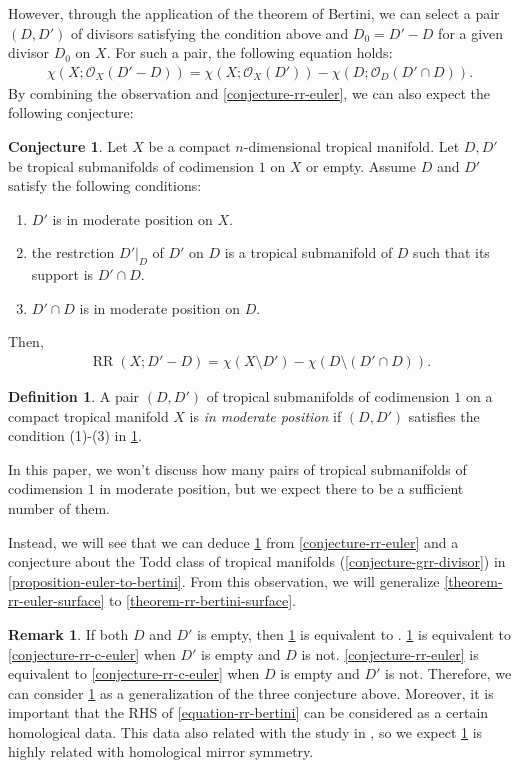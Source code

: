\documentclass[a4paper,dvipdfmx,reqno,12pt]{amsart}
\theoremstyle{definition}
\newtheorem{definition}[theorem]{Definition}
\newtheorem{conjecture}[theorem]{Conjecture}
\newtheorem{remark}[theorem]{Remark}
\newcommand{\opn}[1]{\operatorname{#1}}
\numberwithin{equation}{section}
\begin{document}
However, through the application of the theorem of
Bertini, we can select a pair $(D,D')$ of divisors 
satisfying the condition above 
and $D_0=D'-D$ for a given divisor $D_0$ on $X$.
For such a pair, the following equation holds:
\begin{align}
\chi(X;\mathcal{O}_X(D'-D))=
\chi(X;\mathcal{O}_X(D'))-
\chi(D;\mathcal{O}_D(D'\cap D)).
\end{align}
By combining the observation and \cref{conjecture-rr-euler}, 
we can also expect the following conjecture:
\begin{conjecture}
\label{conjecture-rr-bertini}
Let $X$ be a compact $n$-dimensional
tropical manifold. 
Let $D,D'$ be tropical submanifolds of codimension $1$
on $X$ or empty.
Assume $D$ and $D'$ satisfy the following conditions:
\begin{enumerate}
\item $D'$ is in moderate position on $X$.
\item the restrction $D'|_{D}$ of $D'$ on $D$ is 
a tropical submanifold of $D$ such that its support is   
$D'\cap D$.
\item $D'\cap D$ is in moderate position on $D$.
\end{enumerate}
Then,
\begin{align}
\label{equation-rr-bertini}
\opn{RR}(X;D'-D)=\chi (X\setminus D')-
\chi(D\setminus (D'\cap D)).
\end{align}

\end{conjecture}

\begin{definition}
A pair $(D,D')$ of tropical submanifolds of codimension 
$1$ on a compact tropical manifold $X$ is 
\emph{in moderate position} if $(D,D')$ satisfies
the condition (1)-(3) in \cref{conjecture-rr-bertini}.
\end{definition}
In this paper, we won't discuss how many pairs of 
tropical submanifolds of codimension $1$ in moderate position,
but we expect there to be a sufficient number of them.

Instead, we will see that we can deduce
\cref{conjecture-rr-bertini} from 
\cref{conjecture-rr-euler} and 
a conjecture about the Todd class of tropical 
manifolds (\cref{conjecture-grr-divisor})
in \cref{proposition-euler-to-bertini}.
From this observation, we will
generalize \cref{theorem-rr-euler-surface}
to \cref{theorem-rr-bertini-surface}.
\begin{remark}
If both $D$ and $D'$ is empty, then
\cref{conjecture-rr-bertini} is equivalent to
\cite[Conjecture 6.13]{demedrano2023chern}.
\cref{conjecture-rr-bertini} is equivalent to
\cref{conjecture-rr-c-euler} when 
$D'$ is empty and $D$ is not.
\cref{conjecture-rr-euler} is 
equivalent to
\cref{conjecture-rr-c-euler} when 
$D$ is empty and $D'$ is not.
Therefore, we can consider 
\cref{conjecture-rr-bertini} as a generalization
of the three conjecture above.
Moreover, it is important that 
the RHS of \eqref{equation-rr-bertini} 
can be considered as a certain homological data.
This data also related with the study in 
\cite{tsutsui2023graded}, so we expect 
\cref{conjecture-rr-bertini} is highly related
with homological mirror symmetry.
\end{remark}
\end{document}
